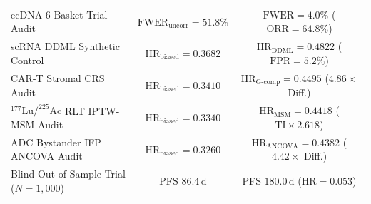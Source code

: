 \documentclass[aps,prx,twocolumn,superscriptaddress,longbibliography,nofootinbib]{revtex4-2}
\begin{document}
\begin{table}[htbp]
\begin{tabular}{lcc}
ecDNA 6-Basket Trial Audit & $\mathrm{FWER}_{\mathrm{uncorr}}=51.8\%$ & $\mathrm{FWER}=4.0\%$ ($\mathrm{ORR}=64.8\%$) \\
scRNA DDML Synthetic Control & $\mathrm{HR}_{\mathrm{biased}}=0.3682$ & $\mathrm{HR}_{\mathrm{DDML}}=0.4822$ ($\mathrm{FPR}=5.2\%$) \\
CAR-T Stromal CRS Audit & $\mathrm{HR}_{\mathrm{biased}}=0.3410$ & $\mathrm{HR}_{\mathrm{G\text{-}comp}}=0.4495$ ($4.86\times$ Diff.) \\
$^{177}\mathrm{Lu}/^{225}\mathrm{Ac}$ RLT IPTW-MSM Audit & $\mathrm{HR}_{\mathrm{biased}}=0.3340$ & $\mathrm{HR}_{\mathrm{MSM}}=0.4418$ ($\mathrm{TI}\times 2.618$) \\
ADC Bystander IFP ANCOVA Audit & $\mathrm{HR}_{\mathrm{biased}}=0.3260$ & $\mathrm{HR}_{\mathrm{ANCOVA}}=0.4382$ ($4.42\times$ Diff.) \\
Blind Out-of-Sample Trial ($N=1,000$) & PFS $86.4\,\mathrm{d}$ & PFS $180.0\,\mathrm{d}$ ($\mathrm{HR}=0.053$) \\
\bottomrule
\end{tabular}
\end{table}
\end{document}
